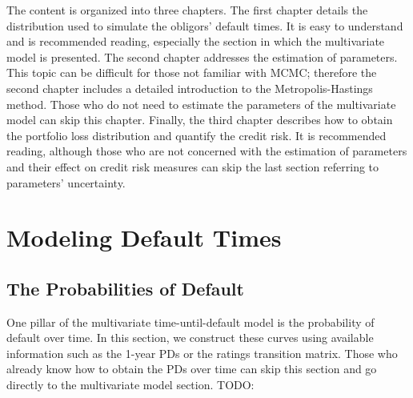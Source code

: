 \documentclass[11pt,fleqn]{book} %
\begin{document}
The content is organized into three chapters. The first chapter details the 
distribution used to simulate the obligors' default times. It is easy to 
understand and is recommended reading, especially the section in which the 
multivariate model is presented. The second chapter addresses the estimation 
of parameters. This topic can be difficult for those not familiar with MCMC; 
therefore the second chapter includes a detailed introduction to the 
Metropolis-Hastings method. Those who do not need to estimate the parameters 
of the multivariate model can skip this chapter. Finally, the 
third chapter describes how to obtain the portfolio loss distribution and 
quantify the credit risk. It is recommended reading, although those who are 
not concerned with the estimation of parameters and their effect on credit 
risk measures can skip the last section referring to parameters' uncertainty. 



\chapter{Modeling Default Times}
\label{chap:mdt}

\section{The Probabilities of Default}
\label{sec:pd}

One pillar of the multivariate time-until-default model is the probability 
of default over time. In this section, we construct these curves using 
available information such as the 1-year PDs or the ratings transition 
matrix. Those who already know how to obtain the PDs over time can skip 
this section and go directly to the multivariate model section.
TODO: \cite[sec. 3.2.1]{bindseil:2007}
\end{document}

